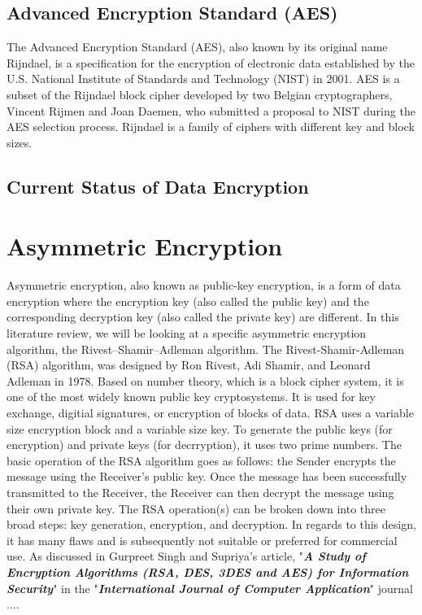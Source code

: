 \documentclass[journal]{IEEEtran}
\begin{document}
\subsection{\textbf{Advanced Encryption Standard (AES)}}
The Advanced Encryption Standard (AES), also known by its original name Rijndael, is a specification for the encryption of electronic data established by the U.S. National Institute of Standards and Technology (NIST) in 2001. AES is a subset of the Rijndael block cipher developed by two Belgian cryptographers, Vincent Rijmen and Joan Daemen, who submitted a proposal to NIST during the AES selection process. Rijndael is a family of ciphers with different key and block sizes.

\subsection{\textbf{Current Status of Data Encryption}}

\section{\textbf{Asymmetric Encryption}}
Asymmetric encryption, also known as public-key encryption, is a form of data encryption where the encryption key (also called the public key) and the corresponding decryption key (also called the private key) are different. In this literature review, we will be looking at a specific asymmetric encryption algorithm, the Rivest–Shamir–Adleman algorithm. The Rivest-Shamir-Adleman (RSA) algorithm, was designed by Ron Rivest, Adi Shamir, and Leonard Adleman in 1978. Based on number theory, which is a block cipher system, it is one of the most widely known public key cryptosystems. It is used for key exchange, digitial signatures, or encryption of blocks of data. RSA uses a variable size encryption block and a variable size key. To generate the public keys (for encryption) and private keys (for decrryption), it uses two prime numbers. The basic operation of the RSA algorithm goes as follows: the Sender encrypts the message using the Receiver's public key. Once the message has been successfully transmitted to the Receiver, the Receiver can then decrypt the message using their own private key. The RSA operation(s) can be broken down into three broad steps: key generation, encryption, and decryption. In regards to this design, it has many flaws and is subsequently not suitable or preferred for commercial use. As discussed in Gurpreet Singh and Supriya's article, "\textbf{\textit{A Study of Encryption Algorithms (RSA, DES, 3DES and AES) for Information Security}}" in the "\textbf{\textit{International Journal of Computer Application}}" journal \cite{Encryption_Study}....
\end{document}
